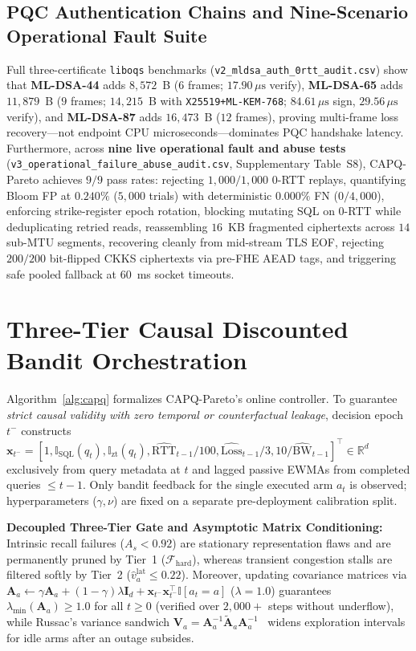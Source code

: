 \documentclass[10pt,journal,compsoc]{IEEEtran}
\begin{document}
\subsection{PQC Authentication Chains and Nine-Scenario Operational Fault Suite}
Full three-certificate \texttt{liboqs} benchmarks (\texttt{v2\_mldsa\_auth\_0rtt\_audit.csv}) show that \textbf{ML-DSA-44} adds $8,572$~B ($6$ frames; $17.90\,\mu\text{s}$ verify), \textbf{ML-DSA-65} adds $11,879$~B ($9$ frames; $14,215$~B with \texttt{X25519+ML-KEM-768}; $84.61\,\mu\text{s}$ sign, $29.56\,\mu\text{s}$ verify), and \textbf{ML-DSA-87} adds $16,473$~B ($12$ frames), proving multi-frame loss recovery—not endpoint CPU microseconds—dominates PQC handshake latency. Furthermore, across \textbf{nine live operational fault and abuse tests} (\texttt{v3\_operational\_failure\_abuse\_audit.csv}, Supplementary Table~S8), CAPQ-Pareto achieves $9/9$ pass rates: rejecting $1,000/1,000$ 0-RTT replays, quantifying Bloom FP at $0.240\%$ ($5,000$ trials) with deterministic $0.000\%$ FN ($0/4,000$), enforcing strike-register epoch rotation, blocking mutating SQL on 0-RTT while deduplicating retried reads, reassembling $16$~KB fragmented ciphertexts across $14$ sub-MTU segments, recovering cleanly from mid-stream TLS EOF, rejecting $200/200$ bit-flipped CKKS ciphertexts via pre-FHE AEAD tags, and triggering safe pooled fallback at $60$~ms socket timeouts.

\section{Three-Tier Causal Discounted Bandit Orchestration}\label{sec:bandit}
Algorithm~\ref{alg:capq} formalizes CAPQ-Pareto's online controller. To guarantee \emph{strict causal validity with zero temporal or counterfactual leakage}, decision epoch $t^-$ constructs $\mathbf{x}_{t^-} = [1, \mathbb{I}_{\mathrm{SQL}}(q_t), \mathbb{I}_{\mathrm{zt}}(q_t), \widehat{\mathrm{RTT}}_{t-1}/100, \widehat{\mathrm{Loss}}_{t-1}/3, 10/\widehat{\mathrm{BW}}_{t-1}]^\top \in \mathbb{R}^d$ exclusively from query metadata at $t$ and lagged passive EWMAs from completed queries $\le t-1$. Only bandit feedback for the single executed arm $a_t$ is observed; hyperparameters ($\gamma, \nu$) are fixed on a separate pre-deployment calibration split.

\textbf{Decoupled Three-Tier Gate and Asymptotic Matrix Conditioning:} Intrinsic recall failures ($A_s < 0.92$) are stationary representation flaws and are permanently pruned by Tier~1 ($\mathcal{F}_{\mathrm{hard}}$), whereas transient congestion stalls are filtered softly by Tier~2 ($\hat{v}_a^{\mathrm{lat}} \le 0.22$). Moreover, updating covariance matrices via $\mathbf{A}_a \leftarrow \gamma\mathbf{A}_a + (1-\gamma)\lambda\mathbf{I}_d + \mathbf{x}_{t^-}\mathbf{x}_{t^-}^\top\mathbb{I}[a_t=a]$ ($\lambda=1.0$) guarantees $\lambda_{\min}(\mathbf{A}_a) \ge 1.0$ for all $t \ge 0$ (verified over $2,000+$ steps without underflow), while Russac's variance sandwich $\mathbf{V}_a = \mathbf{A}_a^{-1}\tilde{\mathbf{A}}_a\mathbf{A}_a^{-1}$~\cite{russac2019dlinucb} widens exploration intervals for idle arms after an outage subsides.
\end{document}
